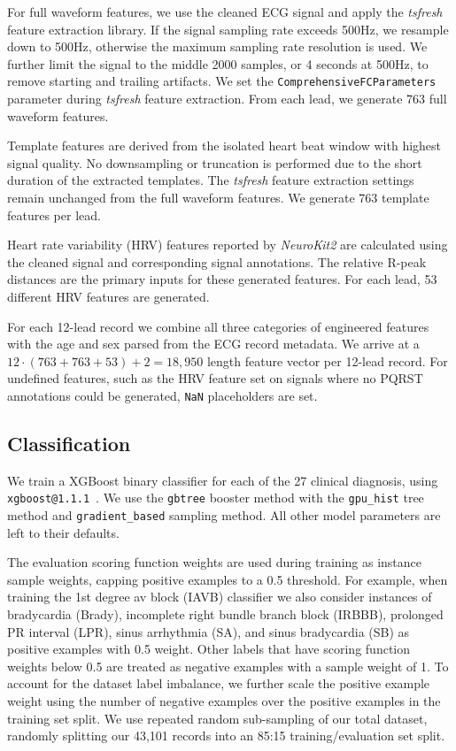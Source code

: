 \documentclass[twocolumn]{cinc}
\begin{document}
For full waveform features, we use the cleaned ECG signal and apply the \emph{tsfresh} feature extraction library.
If the signal sampling rate exceeds 500Hz, we resample down to 500Hz, otherwise the maximum sampling rate resolution is used.
We further limit the signal to the middle 2000 samples, or 4 seconds at 500Hz, to remove starting and trailing artifacts.
We set the \texttt{ComprehensiveFCParameters} parameter during \emph{tsfresh} feature extraction.
From each lead, we generate 763 full waveform features.

Template features are derived from the isolated heart beat window with highest signal quality.
No downsampling or truncation is performed due to the short duration of the extracted templates.
The \emph{tsfresh} feature extraction settings remain unchanged from the full waveform features.
We generate 763 template features per lead.

Heart rate variability (HRV) features reported by \emph{NeuroKit2} are calculated using the cleaned signal and corresponding signal annotations.
The relative R-peak distances are the primary inputs for these generated features.
For each lead, 53 different HRV features are generated.

For each 12-lead record we combine all three categories of engineered features with the age and sex parsed from the ECG record metadata.
We arrive at a $12 \cdot (763 + 763 + 53) + 2 = 18,950$ length feature vector per 12-lead record.
For undefined features, such as the HRV feature set on signals where no PQRST annotations could be generated, \texttt{NaN} placeholders are set.

\subsection{Classification}

We train a XGBoost binary classifier for each of the 27 clinical diagnosis, using \texttt{xgboost@1.1.1}~\cite{chen_xgboost_2016}.
We use the \texttt{gbtree} booster method with the \texttt{gpu\_hist} tree method and \texttt{gradient\_based} sampling method.
All other model parameters are left to their defaults.

The evaluation scoring function weights are used during training as instance sample weights, capping positive examples to a 0.5 threshold.
For example, when training the 1st degree av block (IAVB) classifier we also consider instances of bradycardia (Brady), incomplete right bundle branch block (IRBBB), prolonged PR interval (LPR), sinus arrhythmia (SA), and sinus bradycardia (SB) as positive examples with 0.5 weight.
Other labels that have scoring function weights below 0.5 are treated as negative examples with a sample weight of 1.
To account for the dataset label imbalance, we further scale the positive example weight using the number of negative examples over the positive examples in the training set split.
We use repeated random sub-sampling of our total dataset, randomly splitting our 43,101 records into an 85:15 training/evaluation set split.
\end{document}
